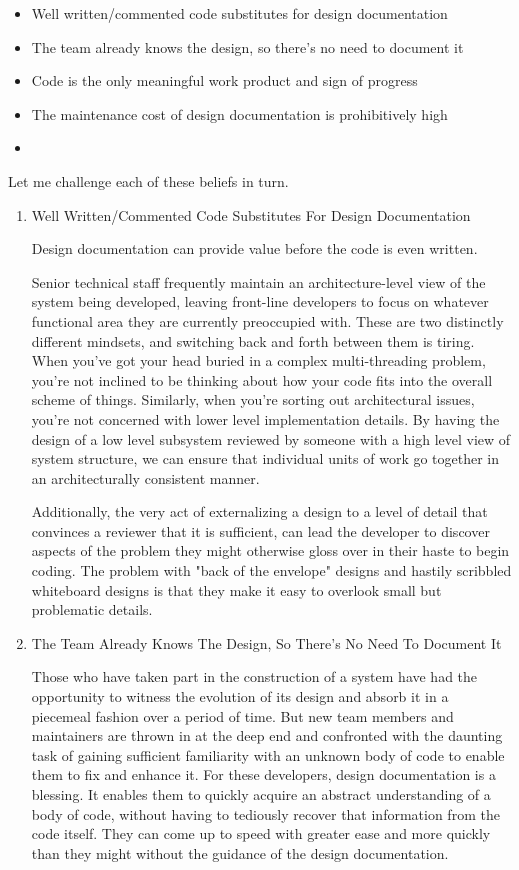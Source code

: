 \documentclass{article}
\begin{document}
\begin{itemize}
\item Well written/commented code substitutes for design documentation
\item The team already knows the design, so there's no need to document it
\item Code is the only meaningful work product and sign of progress
\item The maintenance cost of design documentation is prohibitively high
\item 
\end{itemize}

Let me challenge each of these beliefs in turn.

\begin{enumerate}
\item Well Written/Commented Code Substitutes For Design Documentation
\label{sec:orgheadline250}

Design documentation can provide value before the code is even written.

Senior technical staff frequently maintain an architecture-level view of
the system being developed, leaving front-line developers to focus on
whatever functional area they are currently preoccupied with. These are
two distinctly different mindsets, and switching back and forth between
them is tiring. When you've got your head buried in a complex
multi-threading problem, you're not inclined to be thinking about how
your code fits into the overall scheme of things. Similarly, when you're
sorting out architectural issues, you're not concerned with lower level
implementation details. By having the design of a low level subsystem
reviewed by someone with a high level view of system structure, we can
ensure that individual units of work go together in an architecturally
consistent manner.

Additionally, the very act of externalizing a design to a level of
detail that convinces a reviewer that it is sufficient, can lead the
developer to discover aspects of the problem they might otherwise gloss
over in their haste to begin coding. The problem with "back of the
envelope" designs and hastily scribbled whiteboard designs is that they
make it easy to overlook small but problematic details.

\item The Team Already Knows The Design, So There's No Need To Document
\label{sec:orgheadline251}
It

Those who have taken part in the construction of a system have had the
opportunity to witness the evolution of its design and absorb it in a
piecemeal fashion over a period of time. But new team members and
maintainers are thrown in at the deep end and confronted with the
daunting task of gaining sufficient familiarity with an unknown body of
code to enable them to fix and enhance it. For these developers, design
documentation is a blessing. It enables them to quickly acquire an
abstract understanding of a body of code, without having to tediously
recover that information from the code itself. They can come up to speed
with greater ease and more quickly than they might without the guidance
of the design documentation.


\end{enumerate}
\end{document}
